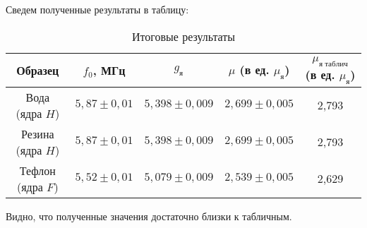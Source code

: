\documentclass[12pt]{kiarticle}
\begin{document}
	Сведем полученные результаты в таблицу:
	
	
	\begin{table}[h!]
		\caption{Итоговые результаты}
		\begin{center}
			\begin{tabular}{|c|c|c|c|c|}
				\hline
				Образец  & $ f_0 $, МГц &$ g_я $  & $ \mu $ (в ед. $ \mu_я $) & $ \mu_{я\; таблич} $ (в ед. $ \mu_я $) \\ \hline
				Вода (ядра $ H $)  & $ 5,87 \pm 0,01 $ &   $ 5,398 \pm 0,009 $   &  $ 2,699 \pm 0,005 $  & 2,793 \\
				Резина (ядра $ H $)  & $ 5,87 \pm 0,01 $ &   $ 5,398 \pm 0,009 $   &  $ 2,699 \pm 0,005 $  & 2,793 \\
				Тефлон (ядра $ F $)  & $ 5,52 \pm 0,01 $ &   $ 5,079 \pm 0,009 $   &  $ 2,539 \pm 0,005 $  & 2,629 \\
				 \hline
			\end{tabular}
		\end{center}
		\label{table_5}
	\end{table}

	Видно, что полученные значения достаточно близки к табличным. 
	
\end{document}
